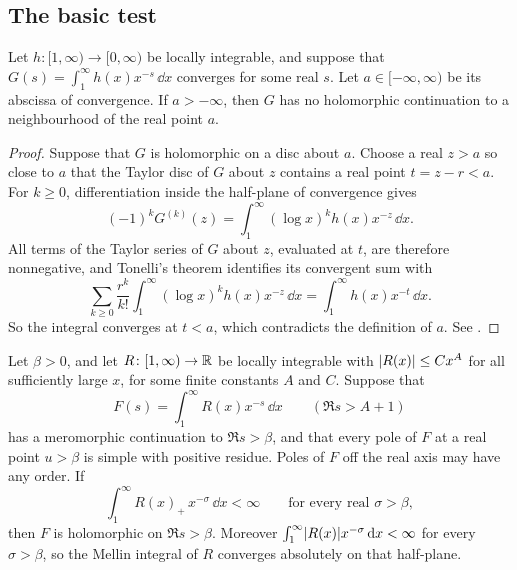 \subsection{The basic test}\label{ana:sec:basic}
{\raggedright{}}

\begin{lemma}[Landau]\label{ana:lem:landau}
Let $h\colon[1,\infty)\to[0,\infty)$ be locally integrable, and suppose that
$G(s)=\int_1^\infty h(x)x^{-s}\,\dd x$ converges for some real $s$. Let $a\in[-\infty,\infty)$
be its abscissa of convergence. If $a>-\infty$, then $G$ has no holomorphic continuation to a
neighbourhood of the real point $a$.
\end{lemma}

\begin{proof}
Suppose that $G$ is holomorphic on a disc about $a$. Choose a real $z>a$ so close to $a$ that
the Taylor disc of $G$ about $z$ contains a real point $t=z-r<a$. For $k\ge0$,
differentiation inside the half-plane of convergence gives
\[
 (-1)^kG^{(k)}(z)=\int_1^\infty(\log x)^kh(x)x^{-z}\,\dd x .
\]
All terms of the Taylor series of $G$ about $z$, evaluated at $t$, are therefore nonnegative,
and Tonelli's theorem identifies its convergent sum with
\[
 \sum_{k\ge0}\frac{r^k}{k!}\int_1^\infty(\log x)^kh(x)x^{-z}\,\dd x
 =\int_1^\infty h(x)x^{-t}\,\dd x .
\]
So the integral converges at $t<a$, which contradicts the definition of $a$. See
\cite[\S15.1]{MontgomeryVaughan2007Multiplicative}.
\end{proof}

\begin{theorem}\label{ana:thm:onesided}
Let $\beta>0$, and let $R\colon[1,\infty)\to\mathbb{R}$ be locally integrable with $\lvert R(x)\rvert\le Cx^{A}$
for all sufficiently large $x$, for some finite constants $A$ and $C$. Suppose that
\[
 F(s)=\int_1^\infty R(x)x^{-s}\,\dd x\qquad(\Re s>A+1)
\]
has a meromorphic continuation to $\Re s>\beta$, and that every pole of $F$ at a real point
$u>\beta$ is simple with positive residue. Poles of $F$ off the real axis may have any order.
If
\begin{equation}\label{ana:eq:posint}
 \int_1^\infty R(x)_+\,x^{-\sigma}\,\dd x<\infty\qquad\text{for every real }\sigma>\beta ,
\end{equation}
then $F$ is holomorphic on $\Re s>\beta$. Moreover
$\int_1^\infty\lvert R(x)\rvert x^{-\sigma}\,\mathrm{d} x<\infty$ for every $\sigma>\beta$, so the Mellin integral
of $R$ converges absolutely on that half-plane.
\end{theorem}

